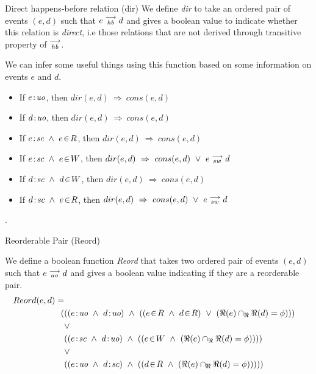 \begin{definition}{Direct happens-before relation (dir)}
    \label{Dir}
    We define \emph{dir} to take an ordered pair of events $(e,d)$ such that $e\stackrel{\longrightarrow}{_{hb}}d$ and gives a boolean value to indicate whether this relation is \textit{direct}, i.e those relations that are not derived through transitive property of $\stackrel{\longrightarrow}{_\textit{hb}}$.
    
    We can infer some useful things using this function based on some information on events $e$ and $d$\footnotemark. 
    \begin{itemize}
        \item If $e\!:\!\textit{uo}$, then $dir(e,d) \ \Rightarrow \ cons(e,d)$ 
        \item If $d\!:\!\textit{uo}$, then $dir(e,d) \ \Rightarrow \ cons(e,d)$
        \item If $\et{e}{sc}\ \wedge\ e\!\in\!R$, then $dir(e,d) \ \Rightarrow \ cons(e,d)$
        \item If $\et{e}{sc}\ \wedge\ e\!\in\!W$, then $dir(e,d) \ \Rightarrow \ cons(e,d)\ \vee\ \reln{e}{sw}{d}$
        \item If $\et{d}{sc}\ \wedge\ d\!\in\!W$, then $dir(e,d) \ \Rightarrow \ cons(e,d)$
        \item If $\et{d}{sc}\ \wedge\ e\!\in\!R$, then $dir(e,d) \ \Rightarrow \ cons(e,d)\ \vee\ \reln{e}{sw}{d}$
    \end{itemize}

    .
\end{definition}


\begin{definition}{Reorderable Pair (Reord)}
    \label{Reord}
    
    We define a boolean function \emph{Reord} that takes two ordered pair of events $(e,d)$ such that $e\stackrel{\longrightarrow}{_{ao}}d$ and gives a boolean value indicating if they are a reorderable pair\footnotemark.   
    \begin{align*}
        Reord(e,d) = \\
        (
        &((\et{e}{uo} \ \wedge \ \et{d}{uo}) \ \wedge \ 
                (   
                    (\event{e}{R} \ \wedge \ \event{d}{R}) \ \vee \ 
                    (\Re(e) \cap_\Re \Re(d) = \phi) 
                )
        ) \\ &\vee \\
        &((\et{e}{sc} \ \wedge \ \et{d}{uo}) \ \wedge \ 
                (
                    (\event{e}{W} \ \wedge \ (\Re(e) \cap_\Re \Re(d) = \phi)) 
                )
        ) \\ &\vee \\
        &((\et{e}{uo} \ \wedge \ \et{d}{sc}) \ \wedge \ 
                (
                    (\event{d}{R} \ \wedge \ (\Re(e) \cap_\Re \Re(d) = \phi)) 
                )
        )
        )
    \end{align*}

\end{definition}

